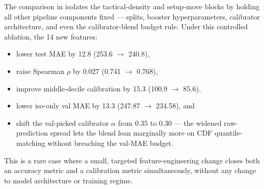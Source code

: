 The comparison in  isolates the tactical-density and setup-move blocks by holding all other pipeline components fixed --- splits, booster hyperparameters, calibrator architecture, and even the calibrator-blend budget rule. Under this controlled ablation, the 14 new features:
\begin{itemize}[leftmargin=*,itemsep=0pt,topsep=0pt]
    \item lower test MAE by 12.8 \elo (253.6 $\to$ 240.8),
    \item raise Spearman $\rho$ by 0.027 (0.741 $\to$ 0.768),
    \item improve middle-decile calibration by 15.3 \elo (100.9 $\to$ 85.6),
    \item lower iso-only val MAE by 13.3 \elo (247.87 $\to$ 234.58), and
    \item shift the val-picked calibrator $\alpha$ from 0.35 to 0.30 --- \ie the widened raw-prediction spread lets the blend lean marginally more on CDF quantile-matching without breaching the val-MAE budget.
\end{itemize}
This is a rare case where a small, targeted feature-engineering change closes both an accuracy metric and a calibration metric simultaneously, without any change to model architecture or training regime.
